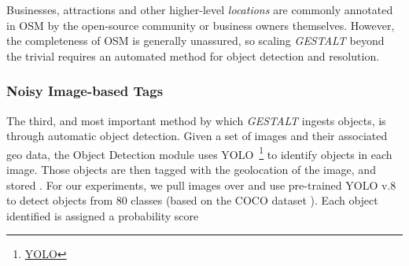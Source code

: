 Businesses, attractions and other higher-level \textit{locations} are commonly annotated in OSM by the open-source community or business owners themselves.
However, the completeness of OSM is generally unassured, so scaling \textit{GESTALT} beyond the trivial requires an automated method for object detection and resolution. 




\subsubsection{Noisy Image-based Tags}
The third, and most important method by which \emph{GESTALT} ingests objects, is through automatic object detection.
Given a set of images and their associated geo data,  the Object Detection module uses YOLO~\footnote{\href{https://github.com/ultralytics/ultralytics}{YOLO}} to identify objects in each image. 
Those objects are then tagged with the geolocation of the image, and stored . 
For our experiments, we pull  images over  and use pre-trained YOLO v.8 to detect objects from 80 classes (based on the COCO dataset ). Each object identified is assigned a probability score 






